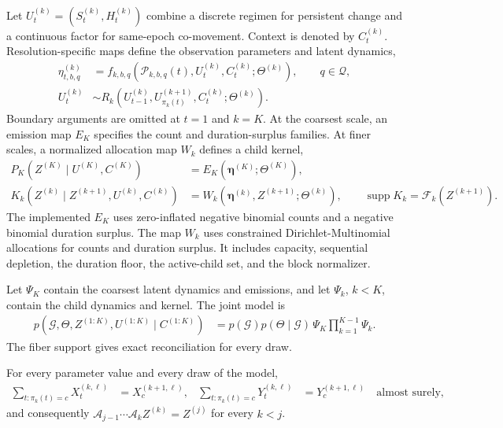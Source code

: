 Let \(U_t^{(k)}=(S_t^{(k)},H_t^{(k)})\) combine a discrete regimen for
persistent change and a continuous factor for same-epoch co-movement. Context
is denoted by \(C_t^{(k)}\). Resolution-specific maps define the observation
parameters and latent dynamics,
\begin{align}
 \eta_{t,b,q}^{(k)}
 &=f_{k,b,q}(\mathcal P_{k,b,q}(t),U_t^{(k)},C_t^{(k)};\Theta^{(k)}),
 \qquad q\in\mathcal Q,
 \label{eq:model_count_score}\\
 U_t^{(k)}
 &\sim R_k(U_{t-1}^{(k)},U_{\pi_k(t)}^{(k+1)},C_t^{(k)};\Theta^{(k)}).
 \label{eq:model_regime_init}
\end{align}
Boundary arguments are omitted at \(t=1\) and \(k=K\). At the coarsest scale,
an emission map \(E_K\) specifies the count and duration-surplus families. At
finer scales, a normalized allocation map \(W_k\) defines a child kernel,
\begin{align}
 P_K(Z^{(K)}\mid U^{(K)},C^{(K)})
 &=E_K(\boldsymbol\eta^{(K)};\Theta^{(K)}),
 \label{eq:model_coarse_count_mean}\\
 K_k(Z^{(k)}\mid Z^{(k+1)},U^{(k)},C^{(k)})
 &=W_k(\boldsymbol\eta^{(k)},Z^{(k+1)};\Theta^{(k)}),
 \qquad \operatorname{supp}K_k=\mathcal F_k(Z^{(k+1)}).
 \label{eq:model_count_omega}
\end{align}
The implemented \(E_K\) uses zero-inflated negative binomial counts and a
negative binomial duration surplus. The map \(W_k\) uses constrained
Dirichlet-Multinomial allocations for counts and duration surplus. It includes
capacity, sequential depletion, the duration floor, the active-child set, and
the block normalizer.

Let \(\Psi_K\) contain the coarsest latent dynamics and emissions, and let
\(\Psi_k\), \(k<K\), contain the child dynamics and kernel. The joint model is
\begin{align}
 p(\mathcal G,\Theta,Z^{(1:K)},U^{(1:K)}\mid C^{(1:K)})
 &=p(\mathcal G)p(\Theta\mid\mathcal G)\,\Psi_K
   \prod_{k=1}^{K-1}\Psi_k.
 \label{eq:model_joint}
\end{align}
The fiber support gives exact reconciliation for every draw.

\begin{proposition}
\label{prop:model_reconciliation}
For every parameter value and every draw of the model,
\begin{align}
 \sum_{t:\pi_k(t)=c}X_t^{(k,\ell)}&=X_c^{(k+1,\ell)},
 &\sum_{t:\pi_k(t)=c}Y_t^{(k,\ell)}&=Y_c^{(k+1,\ell)}
 \quad\text{almost surely},
 \label{eq:model_reconciliation}
\end{align}
and consequently \(\mathcal A_{j-1}\cdots\mathcal A_kZ^{(k)}=Z^{(j)}\) for
every \(k<j\).
\end{proposition}

